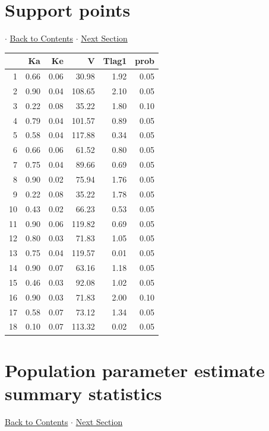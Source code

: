 \documentclass{article}
\begin{document}
          \section{Support points} 
 $\cdot$ \hyperlink{tableofcontents}{Back to Contents} $\cdot$ \hyperlink{ppe}{Next Section} \newline
          \newline 
\begin{tabular}{rrrrrr}
  \hline
 & Ka & Ke & V & Tlag1 & prob \\ 
  \hline
1 & 0.66 & 0.06 & 30.98 & 1.92 & 0.05 \\ 
  2 & 0.90 & 0.04 & 108.65 & 2.10 & 0.05 \\ 
  3 & 0.22 & 0.08 & 35.22 & 1.80 & 0.10 \\ 
  4 & 0.79 & 0.04 & 101.57 & 0.89 & 0.05 \\ 
  5 & 0.58 & 0.04 & 117.88 & 0.34 & 0.05 \\ 
  6 & 0.66 & 0.06 & 61.52 & 0.80 & 0.05 \\ 
  7 & 0.75 & 0.04 & 89.66 & 0.69 & 0.05 \\ 
  8 & 0.90 & 0.02 & 75.94 & 1.76 & 0.05 \\ 
  9 & 0.22 & 0.08 & 35.22 & 1.78 & 0.05 \\ 
  10 & 0.43 & 0.02 & 66.23 & 0.53 & 0.05 \\ 
  11 & 0.90 & 0.06 & 119.82 & 0.69 & 0.05 \\ 
  12 & 0.80 & 0.03 & 71.83 & 1.05 & 0.05 \\ 
  13 & 0.75 & 0.04 & 119.57 & 0.01 & 0.05 \\ 
  14 & 0.90 & 0.07 & 63.16 & 1.18 & 0.05 \\ 
  15 & 0.46 & 0.03 & 92.08 & 1.02 & 0.05 \\ 
  16 & 0.90 & 0.03 & 71.83 & 2.00 & 0.10 \\ 
  17 & 0.58 & 0.07 & 73.12 & 1.34 & 0.05 \\ 
  18 & 0.10 & 0.07 & 113.32 & 0.02 & 0.05 \\ 
   \hline
\end{tabular}
              
          \hypertarget{ppe}{}
          
          \section{Population parameter estimate summary statistics} 
 \hyperlink{tableofcontents}{Back to Contents} $\cdot$ \hyperlink{covforppe}{Next Section} \newline
          \newline 
\end{document}
